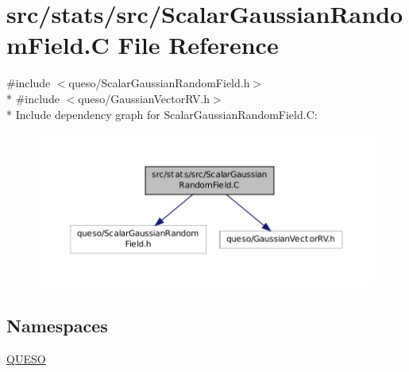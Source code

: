 \hypertarget{_scalar_gaussian_random_field_8_c}{\section{src/stats/src/\-Scalar\-Gaussian\-Random\-Field.C File Reference}
\label{_scalar_gaussian_random_field_8_c}
}
{\ttfamily \#include $<$queso/\-Scalar\-Gaussian\-Random\-Field.\-h$>$}\\*
{\ttfamily \#include $<$queso/\-Gaussian\-Vector\-R\-V.\-h$>$}\\*
Include dependency graph for Scalar\-Gaussian\-Random\-Field.\-C\-:
\nopagebreak
\begin{figure}[H]
\begin{center}
\leavevmode
\includegraphics[width=350pt]{_scalar_gaussian_random_field_8_c__incl}
\end{center}
\end{figure}
\subsection*{Namespaces}
\begin{DoxyCompactItemize}
\item 
\hyperlink{namespace_q_u_e_s_o}{Q\-U\-E\-S\-O}
\end{DoxyCompactItemize}
